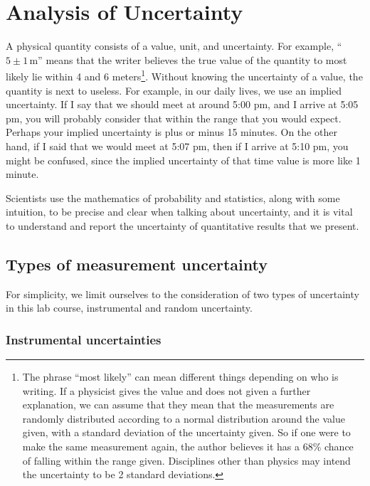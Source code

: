 \chapter{Analysis of Uncertainty}\label{cha:uncertainty}


A physical quantity consists of a value, unit, and uncertainty.
For example, ``$5 \pm 1\,$m'' means that the writer believes the true value of the quantity to most likely lie within 4 and 6 meters\footnote{The phrase ``most likely'' can mean different things depending on who is writing.
	If a physicist gives the value and does not given a further explanation, we can assume that they mean that the measurements are randomly distributed according to a normal distribution around the value given, with a standard deviation of the uncertainty given.
	So if one were to make the same measurement again, the author believes it has a 68\% chance of falling within the range given.
	Disciplines other than physics may intend the uncertainty to be 2 standard deviations.}.
Without knowing the uncertainty of a value, the quantity is next to useless.
For example, in our daily lives, we use an implied uncertainty.
If I say that we should meet at around 5:00 pm, and I arrive at 5:05 pm, you will probably consider that within the range that you would expect.
Perhaps your implied uncertainty is plus or minus 15 minutes.
On the other hand, if I said that we would meet at 5:07 pm, then if I arrive at 5:10 pm, you might be confused, since the implied uncertainty of that time value is more like 1 minute.

Scientists use the mathematics of probability and statistics, along with some intuition, to be precise and clear when talking about uncertainty, and it is vital to understand and report the uncertainty of quantitative results that we present.

\section{Types of measurement uncertainty}

For simplicity, we limit ourselves to the consideration of two types of uncertainty in this lab course, instrumental and random uncertainty.

\subsection{Instrumental uncertainties}

